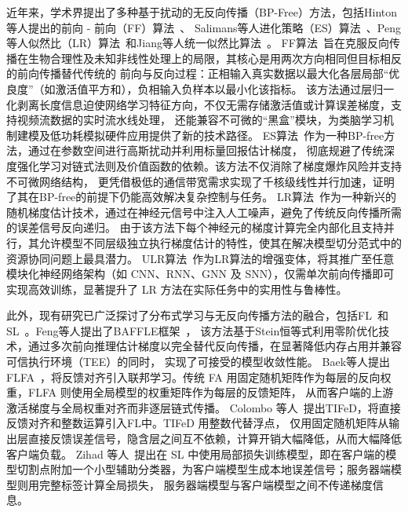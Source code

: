 近年来，学术界提出了多种基于扰动的无反向传播（BP-Free）方法，包括Hinton等人提出的前向 - 前向（FF）算法~\cite{hinton2022forward}、
Salimans等人进化策略（ES）算法~\cite{salimans2017evolution}、Peng等人似然比（LR）算法~\cite{peng2022new}和Jiang等人统一似然比算法~\cite{jiang2023one}。
FF算法~\cite{hinton2022forward}旨在克服反向传播在生物合理性及未知非线性处理上的局限，其核心是用两次方向相同但目标相反的前向传播替代传统的
前向与反向过程：正相输入真实数据以最大化各层局部“优良度”（如激活值平方和），负相输入负样本以最小化该指标。
该方法通过层归一化剥离长度信息迫使网络学习特征方向，不仅无需存储激活值或计算误差梯度，支持视频流数据的实时流水线处理，
还能兼容不可微的“黑盒”模块，为类脑学习机制建模及低功耗模拟硬件应用提供了新的技术路径。
ES算法~\cite{salimans2017evolution}作为一种BP-free方法，通过在参数空间进行高斯扰动并利用标量回报估计梯度，
彻底规避了传统深度强化学习对链式法则及价值函数的依赖。该方法不仅消除了梯度爆炸风险并支持不可微网络结构，
更凭借极低的通信带宽需求实现了千核级线性并行加速，证明了其在BP-free的前提下仍能高效解决复杂控制与任务。
LR算法~\cite{peng2022new}作为一种新兴的随机梯度估计技术，通过在神经元信号中注入人工噪声，避免了传统反向传播所需的误差信号反向递归。
由于该方法下每个神经元的梯度计算完全内部化且支持并行，其允许模型不同层级独立执行梯度估计的特性，使其在解决模型切分范式中的资源协同问题上最具潜力。
ULR算法~\cite{jiang2023one}作为LR算法的增强变体，将其推广至任意模块化神经网络架构（如 CNN、RNN、GNN 及 SNN），仅需单次前向传播即可实现高效训练，显著提升了 LR 方法在实际任务中的实用性与鲁棒性。

此外，现有研究已广泛探讨了分布式学习与无反向传播方法的融合，包括FL~\cite{feng2024baffle,baek2025federated,colombo2023tifed}和SL~\cite{zihad2026decoupled}。Feng等人提出了BAFFLE框架~\cite{feng2024baffle}，
该方法基于Stein恒等式利用零阶优化技术，通过多次前向推理估计梯度以完全替代反向传播，在显著降低内存占用并兼容可信执行环境（TEE）的同时，
实现了可接受的模型收敛性能。
Baek等人提出FLFA~\cite{baek2025federated}，将反馈对齐引入联邦学习。传统 FA 用固定随机矩阵作为每层的反向权重，FLFA 则使用全局模型的权重矩阵作为每层的反馈矩阵，
从而客户端的上游激活梯度与全局权重对齐而非逐层链式传播。
Colombo 等人~\cite{colombo2023tifed}提出TIFeD，将直接反馈对齐和整数运算引入FL中。TIFeD 用整数代替浮点，
仅用固定随机矩阵从输出层直接反馈误差信号，隐含层之间互不依赖，计算开销大幅降低，从而大幅降低客户端负载。
Zihad 等人~\cite{zihad2026decoupled}提出在 SL 中使用局部损失训练模型，即在客户端的模型切割点附加一个小型辅助分类器，为客户端模型生成本地误差信号；服务器端模型则用完整标签计算全局损失，
服务器端模型与客户端模型之间不传递梯度信息。

